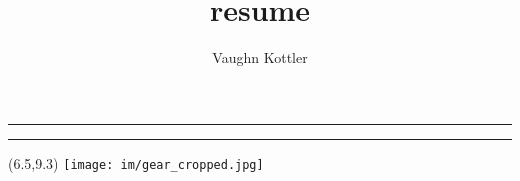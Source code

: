 \documentclass[letterpaper,10pt]{article}
\title{resume}
\author{Vaughn Kottler}
\newcommand{\HR}{{\centering\noindent\rule{7.75in}{0.5pt}}\break}
\begin{document}
%
\noindent
\noindent
\noindent
\HR

\noindent
\noindent
\HR
%
\begin{textblock}{1.25}(6.5,9.3)
\texttt{[image: im/gear\_cropped.jpg]}
\end{textblock}
\noindent

\end{document}
